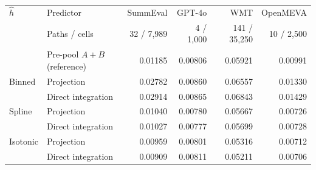 \begin{tabular}{llrrrr}
\toprule
$\hat h$ & Predictor & SummEval & GPT-4o & WMT & OpenMEVA \\
 & Paths / cells & 32 / 7,989 & 4 / 1,000 & 141 / 35,250 & 10 / 2,500 \\
\midrule
 & Pre-pool $A{+}B$ (reference) & 0.01185 & 0.00806 & 0.05921 & 0.00991 \\
\midrule
Binned & Projection & 0.02782 & 0.00860 & 0.06557 & 0.01330 \\
 & Direct integration & 0.02914 & 0.00865 & 0.06843 & 0.01429 \\
\midrule
Spline & Projection & 0.01040 & 0.00780 & 0.05667 & 0.00726 \\
 & Direct integration & 0.01027 & 0.00777 & 0.05699 & 0.00728 \\
\midrule
Isotonic & Projection & 0.00959 & 0.00801 & 0.05316 & 0.00712 \\
 & Direct integration & 0.00909 & 0.00811 & 0.05211 & 0.00706 \\
\bottomrule
\end{tabular}
